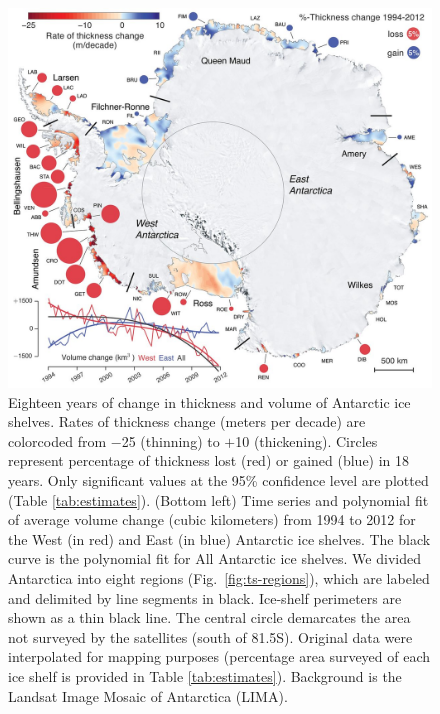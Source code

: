 \begin{figure}[!h]
  \centering
  \includegraphics[width=\textwidth]{img/Fig1_dzdt_map_final.jpg}
  \caption[Eighteen years of change in thickness and volume]{
  Eighteen years of change in thickness and volume of Antarctic
  ice shelves. Rates of thickness change (meters per decade) are colorcoded
  from $-$25 (thinning) to $+$10 (thickening). Circles represent percentage of
  thickness lost (red) or gained (blue) in 18 years. Only significant values at
  the 95\% confidence level are plotted (Table \ref{tab:estimates}). (Bottom left)
  Time series and polynomial fit of average volume change (cubic kilometers)
  from 1994 to 2012 for the West (in red) and East (in blue) Antarctic ice
  shelves. The black curve is the polynomial fit for All Antarctic ice shelves.
  We divided Antarctica into eight regions (Fig.~\ref{fig:ts-regions}), which are labeled
  and delimited by line segments in black. Ice-shelf perimeters are shown as a
  thin black line. The central circle demarcates the area not surveyed by the
  satellites (south of 81.5\degree S). Original data were interpolated for
  mapping purposes (percentage area surveyed of each ice shelf is provided in
  Table \ref{tab:estimates}). Background is the Landsat Image Mosaic of Antarctica
  (LIMA).}
  \label{fig:ice-shelf-change}
\end{figure}
\clearpage


